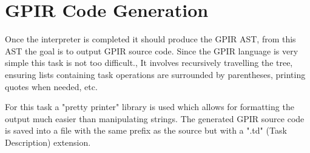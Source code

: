 \section{GPIR Code Generation}

Once the interpreter is completed it should produce the GPIR AST, 
from this AST the goal is to output GPIR source code.
Since the GPIR language is very simple this task is not too difficult.,
It involves recursively travelling the tree, ensuring lists containing task operations
are surrounded by parentheses, printing quotes when needed, etc.

For this task a "pretty printer" library is used which allows for formatting
the output much easier than manipulating strings. The generated GPIR source code
is saved into a file with the same prefix as the source but with a ".td" (Task Description)
extension.
